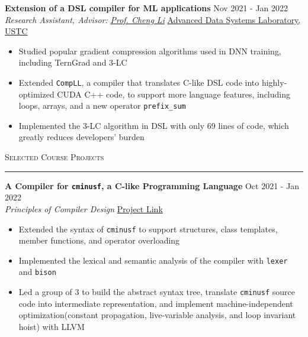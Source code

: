 \documentclass[11pt,letterpaper]{article}
\newcommand{\allnotes}[1]{\textit{#1}}
\newcommand{\alvin}[1]{\allnotes{\textcolor{purple}{[Alvin: #1]}}}
\newcommand{\ryan}[1]{\textcolor{blue}{#1}}
\newcommand{\myline}{\par
  \kern3pt %
  \hrule height 0.8pt
  \kern5pt %
}
\newenvironment{ssubtitle}{\fontfamily{ptm}\selectfont}{}
\newcommand{\subtitle}[1]{\Large{\textsc{#1}}}
\begin{document}
\noindent
\textbf{Extension of a DSL compiler for ML applications} \hfill Nov 2021 - Jan 2022\\
\textit{Research Assistant, Advisor:} \href{http://staff.ustc.edu.cn/~chengli7/}{\textit{Prof. Cheng Li}} \hfill {\href{http://adsl.ustc.edu.cn/}{Advanced Data Systems Laboratory, USTC}}
\begin{itemize}[noitemsep, topsep=0pt, leftmargin=11pt]
    \item Studied popular gradient compression algorithms used in DNN training, including TernGrad and 3-LC
    \item Extended \texttt{CompLL}, a compiler that translates C-like DSL code into highly-optimized CUDA C++ code, to support more language features, including loops, arrays, and a new operator \texttt{prefix\_sum} %
    \item Implemented the 3-LC algorithm in DSL with only 69 lines of code, which greatly reduces developers' burden
\end{itemize}

\vspace{8pt} \noindent
\begin{ssubtitle}\subtitle{Selected Course Projects}\end{ssubtitle}
\myline

\noindent
\textbf{A Compiler for \texttt{cminusf}, a C-like Programming Language} \hfill Oct 2021 - Jan 2022 \\
\textit{Principles of Compiler Design} \hfill {\href{https://github.com/ryanyuan-yyr/2021fall-compiler\_cminus}{Project Link}}
\begin{itemize}[noitemsep, topsep=0pt, leftmargin=11pt]
    \item Extended the syntax of \texttt{cminusf} to support structures, class templates, member functions, and operator overloading
    \item Implemented the lexical and semantic analysis of the compiler with \texttt{lexer} and \texttt{bison}
    \item Led a group of 3 to build the abstract syntax tree, translate \texttt{cminusf} source code into intermediate representation, and implement machine-independent optimization(constant propagation, live-variable analysis, and loop invariant hoist) with LLVM
\end{itemize}
\end{document}
